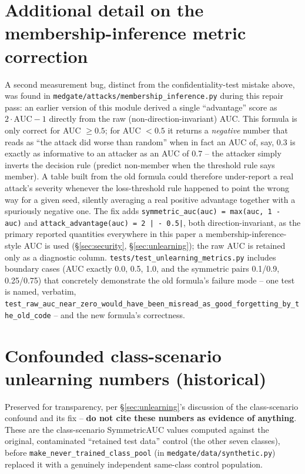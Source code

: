 \documentclass[11pt]{article}
\begin{document}
\section{Additional detail on the membership-inference metric correction}
\label{app:mi-metric-fix}
A second measurement bug, distinct from the confidentiality-test mistake
above, was found in \texttt{medgate/attacks/membership\_inference.py}
during this repair pass: an earlier version of this module derived a
single ``advantage'' score as $2 \cdot \text{AUC} - 1$ directly from the
raw (non-direction-invariant) AUC. This formula is only correct for
AUC $\ge 0.5$; for AUC $< 0.5$ it returns a \emph{negative} number that
reads as ``the attack did worse than random'' when in fact an AUC
of, say, 0.3 is exactly as informative to an attacker as an AUC of 0.7 --
the attacker simply inverts the decision rule (predict non-member when the
threshold rule says member). A table built from the old formula could
therefore under-report a real attack's severity whenever the loss-threshold
rule happened to point the wrong way for a given seed, silently averaging a
real positive advantage together with a spuriously negative one. The fix
adds \texttt{symmetric\_auc(auc) = max(auc, 1 - auc)} and
\texttt{attack\_advantage(auc) = 2\,| - 0.5|}, both direction-invariant,
as the primary reported quantities everywhere in this paper a
membership-inference-style AUC is used (\S\ref{sec:security},
\S\ref{sec:unlearning}); the raw AUC is retained only as a diagnostic
column. \texttt{tests/test\_unlearning\_metrics.py} includes boundary
cases (AUC exactly 0.0, 0.5, 1.0, and the symmetric pairs 0.1/0.9,
0.25/0.75) that concretely demonstrate the old formula's failure mode --
one test is named, verbatim,
\texttt{test\_raw\_auc\_near\_zero\_would\_have\_been\_misread\_as\_good\_forgetting\_by\_the\_old\_code}
-- and the new formula's correctness.

\section{Confounded class-scenario unlearning numbers (historical)}
\label{app:phase5-confounded}
{\sloppy Preserved for transparency, per \S\ref{sec:unlearning}'s
discussion of the class-scenario confound and its fix -- \textbf{do not
cite these numbers as evidence of anything}. These are the class-scenario
SymmetricAUC values computed against the original, contaminated ``retained
test data'' control (the other seven classes), before
\texttt{make\_never\_trained\_class\_pool} (in
\texttt{medgate/data/synthetic.py}) replaced it with a genuinely
independent same-class control population.\par}

\label{tab:phase5-confounded}
\end{document}
